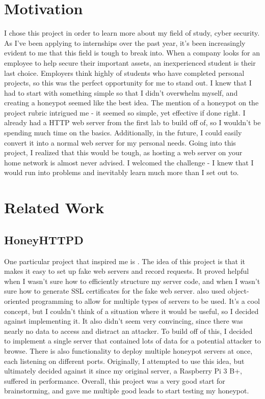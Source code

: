 \documentclass[12pt]{article}
\begin{document}
\section{Motivation}
I chose this project in order to learn more about my field of study, cyber security.
As I've been applying to internships over the past year, it's been increasingly evident to me that this field is tough to break into.
When a company looks for an employee to help secure their important assets, an inexperienced student is their last choice.
Employers think highly of students who have completed personal projects, so this was the perfect opportunity for me to stand out.
I knew that I had to start with something simple so that I didn't overwhelm myself, and creating a honeypot seemed like the best idea.
The mention of a honeypot on the project rubric intrigued me - it seemed so simple, yet effective if done right.
I already had a HTTP web server from the first lab to build off of, so I wouldn't be spending much time on the basics.
Additionally, in the future, I could easily convert it into a normal web server for my personal needs.
Going into this project, I realized that this would be tough, as hosting a web server on your home network is almost never advised.
I welcomed the challenge - I knew that I would run into problems and inevitably learn much more than I set out to.


\section{Related Work}
\subsection{HoneyHTTPD}
One particular project that inspired me is .
The idea of this project is that it makes it easy to set up fake web servers and record requests.
It proved helpful when I wasn't sure how to efficiently structure my server code, and when I wasn't sure how to generate SSL certificates for the fake web server.
\textcite{honeyhttpd} also used object-oriented programming to allow for multiple types of servers to be used.
It's a cool concept, but I couldn't think of a situation where it would be useful, so I decided against implementing it.
It also didn't seem very convincing, since there was nearly no data to access and distract an attacker.
To build off of this, I decided to implement a single server that contained lots of data for a potential attacker to browse.
There is also functionality to deploy multiple honeypot servers at once, each listening on different ports.
Originally, I attempted to use this idea, but ultimately decided against it since my original server, a Raspberry Pi 3 B+, suffered in performance.
Overall, this project was a very good start for brainstorming, and gave me multiple good leads to start testing my honeypot.
\end{document}
